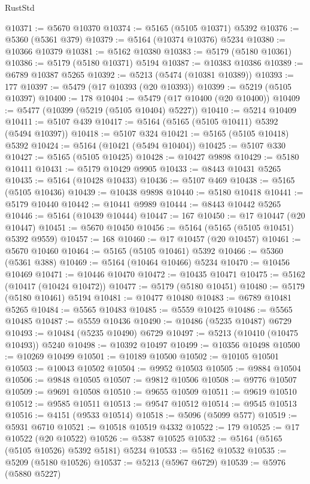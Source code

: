 \begin{lexlean}{RustStd}
\begin{coremodule}
@10371 := @5670 @10370
@10374 := @5165 (@5105 @10371) @5392
@10376 := @5360 (@5361 @379)
@10379 := @5164 (@10374 @10376) @5234
@10380 := @10366 @10379
@10381 := @5162 @10380
@10383 := @5179 (@5180 @10361)
@10386 := @5179 (@5180 @10371) @5194
@10387 := @10383 @10386
@10389 := @6789 @10387 @5265
@10392 := @5213 (@5474 (@10381 @10389))
@10393 := 177
@10397 := @5479 (@17 @10393 (@20 @10393))
@10399 := @5219 (@5105 @10397)
@10400 := 178
@10404 := @5479 (@17 @10400 (@20 @10400))
@10409 := @5477 (@10399 (@5219 (@5105 @10404) @5227))
@10410 := @5214 @10409
@10411 := @5107 @439
@10417 := @5164 (@5165 (@5105 @10411) @5392 (@5494 @10397))
@10418 := @5107 @324
@10421 := @5165 (@5105 @10418) @5392
@10424 := @5164 (@10421 (@5494 @10404))
@10425 := @5107 @330
@10427 := @5165 (@5105 @10425)
@10428 := @10427 @9898
@10429 := @5180 @10411
@10431 := @5179 @10429 @9905
@10433 := @8443 @10431 @5265
@10435 := @5164 (@10428 @10433)
@10436 := @5107 @469
@10438 := @5165 (@5105 @10436)
@10439 := @10438 @9898
@10440 := @5180 @10418
@10441 := @5179 @10440
@10442 := @10441 @9989
@10444 := @8443 @10442 @5265
@10446 := @5164 (@10439 @10444)
@10447 := 167
@10450 := @17 @10447 (@20 @10447)
@10451 := @5670 @10450
@10456 := @5164 (@5165 (@5105 @10451) @5392 @9559)
@10457 := 168
@10460 := @17 @10457 (@20 @10457)
@10461 := @5670 @10460
@10464 := @5165 (@5105 @10461) @5392
@10466 := @5360 (@5361 @388)
@10469 := @5164 (@10464 @10466) @5234
@10470 := @10456 @10469
@10471 := @10446 @10470
@10472 := @10435 @10471
@10475 := @5162 (@10417 (@10424 @10472))
@10477 := @5179 (@5180 @10451)
@10480 := @5179 (@5180 @10461) @5194
@10481 := @10477 @10480
@10483 := @6789 @10481 @5265
@10484 := @5565 @10483
@10485 := @5559 @10425
@10486 := @5565 @10485
@10487 := @5559 @10436
@10490 := @10486 (@5235 @10487) @6729
@10493 := @10484 (@5235 @10490) @6729
@10497 := @5213 (@10410 (@10475 @10493)) @5240
@10498 := @10392 @10497
@10499 := @10356 @10498
@10500 := @10269 @10499
@10501 := @10189 @10500
@10502 := @10105 @10501
@10503 := @10043 @10502
@10504 := @9952 @10503
@10505 := @9884 @10504
@10506 := @9848 @10505
@10507 := @9812 @10506
@10508 := @9776 @10507
@10509 := @9691 @10508
@10510 := @9655 @10509
@10511 := @9619 @10510
@10512 := @9585 @10511
@10513 := @9547 @10512
@10514 := @9545 @10513
@10516 := @4151 (@9533 @10514)
@10518 := @5096 (@5099 @577)
@10519 := @5931 @6710
@10521 := @10518 @10519 @4332
@10522 := 179
@10525 := @17 @10522 (@20 @10522)
@10526 := @5387 @10525
@10532 := @5164 (@5165 (@5105 @10526) @5392 @5181) @5234
@10533 := @5162 @10532
@10535 := @5209 (@5180 @10526)
@10537 := @5213 (@5967 @6729)
@10539 := @5976 (@5880 @5227)

\end{coremodule}
\end{lexlean}
